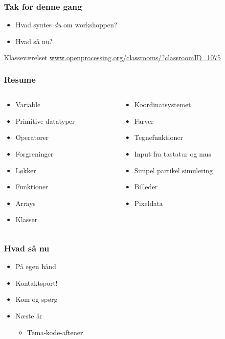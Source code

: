 \documentclass{beamer}
\begin{document}
\begin{frame}
  \frametitle{Tak for denne gang}

  \begin{itemize}
  \item Hvad syntes \emph{du} om workshoppen?
  \item Hvad så nu?
  \end{itemize}

  \begin{block}{Klasseværelset}
    \url{www.openprocessing.org/classrooms/?classroomID=1075}
  \end{block}

\end{frame}


\begin{frame}
  \frametitle{Resume}
  \begin{columns}
    \begin{column}{0.5\textwidth}
      \begin{itemize}
      \item Variable
      \item Primitive datatyper
      \item Operatorer
      \item Forgreninger
      \item Løkker
      \item Funktioner
      \item Arrays
      \item Klasser
      \end{itemize}
    \end{column}
    \begin{column}{0.5\textwidth}        
      \begin{itemize}
      \item Koordinatsystemet
      \item Farver
      \item Tegnefunktioner
      \item Input fra tastatur og mus
      \item Simpel partikel simulering
      \item Billeder
      \item Pixeldata
      \end{itemize}
    \end{column}
  \end{columns}    
\end{frame}


\begin{frame}
  \frametitle{Hvad så nu}
      \begin{itemize}
      \item På egen hånd
      \item Kontaktsport!
      \item Kom og spørg
      \item Næste år
        \begin{itemize}
        \item Tema-kode-aftener
        \end{itemize}
      \end{itemize}
\end{frame}
\end{document}
